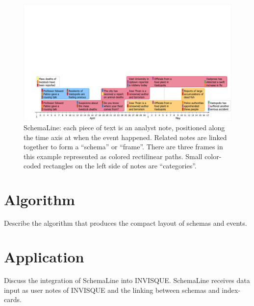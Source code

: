 \begin{figure}[ht]
	\centering
	\includegraphics[width=\linewidth]{teaser}
	\caption{SchemaLine: each piece of text is an analyst note, positioned along the time axis at when the event happened. Related notes are linked together to form a ``schema'' or ``frame''. There are three frames in this example represented as colored rectilinear paths. Small color-coded rectangles on the left side of notes are ``categories''.}
	\label{fig:teaser}
\end{figure}

\section{Algorithm}

Describe the algorithm that produces the compact layout of schemas and events.



\section{Application}
Discuss the integration of SchemaLine into INVISQUE. SchemaLine receives data input as user notes of INVISQUE and the linking between schemas and index-cards.

